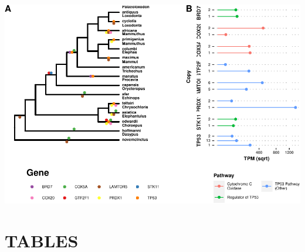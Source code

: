 \documentclass[]{elsarticle} %
\let\origfigure\figure
\let\endorigfigure\endfigure
\renewenvironment{figure}[1][2] {
    \expandafter\origfigure\expandafter[H]
} {
    \endorigfigure
}
\begin{document}
\begin{figure}[H]
\includegraphics[width=6in,]{paper_PLOS_draft_files/figure-latex/Figure-loxAfrTP53-1} \caption{TP53-related genes are also duplicated and functional in \emph{Loxodonta africana}. \textbf{A)} Cladogram of \emph{Atlantogenata} highlighting along each branch when duplications for each gene occured. \textbf{B)} Gene expression data collected from pulically-available RNA-seq data for each duplicate in \textbf{A)}.}\label{fig:Figure-loxAfrTP53}
\end{figure}

\hypertarget{tables}{%
\section{TABLES}\label{tables}}
\end{document}

